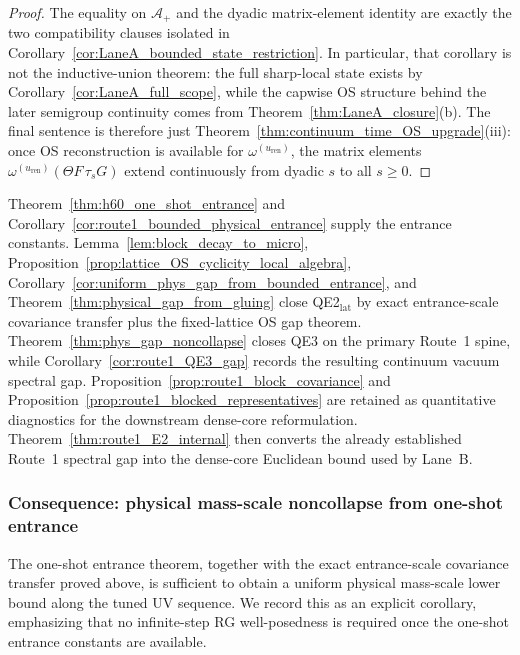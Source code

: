 \begin{proof}
The equality on $\mathcal A_+$ and the dyadic matrix-element identity are exactly the two compatibility clauses isolated in Corollary~\ref{cor:LaneA_bounded_state_restriction}.
In particular, that corollary is not the inductive-union theorem: the full sharp-local state exists by Corollary~\ref{cor:LaneA_full_scope}, while the capwise OS structure behind the later semigroup continuity comes from Theorem~\ref{thm:LaneA_closure}(b).
The final sentence is therefore just Theorem~\ref{thm:continuum_time_OS_upgrade}(iii): once OS reconstruction is available for $\omega^{(u_{\mathrm{ren}})}$, the matrix elements $\omega^{(u_{\mathrm{ren}})}(\Theta F\,\tau_s G)$ extend continuously from dyadic $s$ to all $s\ge 0$.
\end{proof}

\begin{remark}\label{rem:route1_dense_core_summary}
Theorem~\ref{thm:h60_one_shot_entrance} and Corollary~\ref{cor:route1_bounded_physical_entrance} supply the entrance constants.
Lemma~\ref{lem:block_decay_to_micro}, Proposition~\ref{prop:lattice_OS_cyclicity_local_algebra}, Corollary~\ref{cor:uniform_phys_gap_from_bounded_entrance}, and Theorem~\ref{thm:physical_gap_from_gluing} close QE2$_{\mathrm{lat}}$ by exact entrance-scale covariance transfer plus the fixed-lattice OS gap theorem.
Theorem~\ref{thm:phys_gap_noncollapse} closes QE3 on the primary Route~1 spine, while Corollary~\ref{cor:route1_QE3_gap} records the resulting continuum vacuum spectral gap.
Proposition~\ref{prop:route1_block_covariance} and Proposition~\ref{prop:route1_blocked_representatives} are retained as quantitative diagnostics for the downstream dense-core reformulation.
Theorem~\ref{thm:route1_E2_internal} then converts the already established Route~1 spectral gap into the dense-core Euclidean bound used by Lane~B.
\end{remark}


\subsubsection{Consequence: physical mass-scale noncollapse from one-shot entrance}

The one-shot entrance theorem, together with the exact entrance-scale covariance transfer proved above, is sufficient to obtain a uniform physical mass-scale lower bound along the tuned UV sequence.
We record this as an explicit corollary, emphasizing that no infinite-step RG well-posedness is required once the one-shot entrance constants are available.

